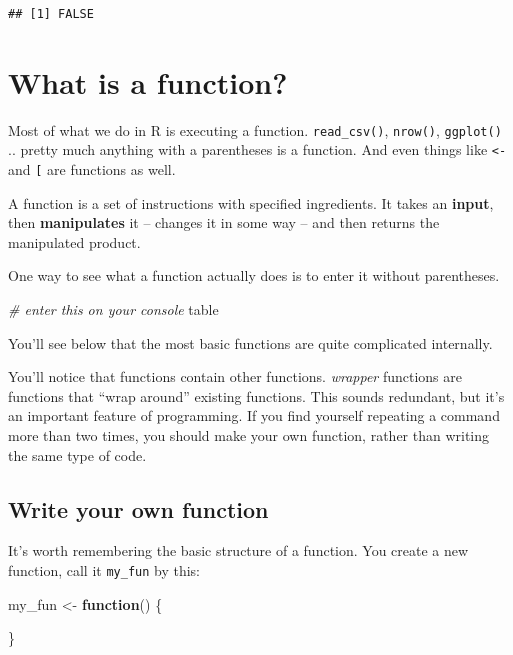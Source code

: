 \documentclass[]{book}
\newenvironment{Shaded}{\begin{snugshade}}{\end{snugshade}}
\newcommand{\CommentTok}[1]{\textcolor[rgb]{0.56,0.35,0.01}{\textit{#1}}}
\newcommand{\ControlFlowTok}[1]{\textcolor[rgb]{0.13,0.29,0.53}{\textbf{#1}}}
\newcommand{\NormalTok}[1]{#1}
\newcommand{\StringTok}[1]{\textcolor[rgb]{0.31,0.60,0.02}{#1}}
\theoremstyle{definition}
\theoremstyle{definition}
\theoremstyle{definition}
\theoremstyle{remark}
\begin{document}
\begin{verbatim}
## [1] FALSE
\end{verbatim}

\hypertarget{what-is-a-function}{%
\section{What is a function?}\label{what-is-a-function}}

Most of what we do in R is executing a function. \texttt{read\_csv()}, \texttt{nrow()}, \texttt{ggplot()} .. pretty much anything with a parentheses is a function. And even things like \texttt{\textless{}-} and \texttt{{[}} are functions as well.

A function is a set of instructions with specified ingredients. It takes an \textbf{input}, then \textbf{manipulates} it -- changes it in some way -- and then returns the manipulated product.

One way to see what a function actually does is to enter it without parentheses.

\begin{Shaded}
\begin{Highlighting}[]
\CommentTok{# enter this on your console}
\NormalTok{table}
\end{Highlighting}
\end{Shaded}

You'll see below that the most basic functions are quite complicated internally.

You'll notice that functions contain other functions. \emph{wrapper} functions are functions that ``wrap around'' existing functions. This sounds redundant, but it's an important feature of programming. If you find yourself repeating a command more than two times, you should make your own function, rather than writing the same type of code.

\hypertarget{write-your-own-function}{%
\subsection{Write your own function}\label{write-your-own-function}}

It's worth remembering the basic structure of a function. You create a new function, call it \texttt{my\_fun} by this:

\begin{Shaded}
\begin{Highlighting}[]
\NormalTok{my_fun <-}\StringTok{ }\ControlFlowTok{function}\NormalTok{() \{}
  
\NormalTok{\}}
\end{Highlighting}
\end{Shaded}
\end{document}
